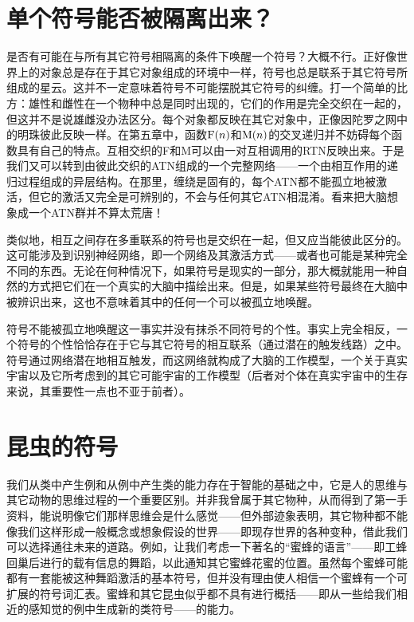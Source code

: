 \section{单个符号能否被隔离出来？}

是否有可能在与所有其它符号相隔离的条件下唤醒一个符号？大概不行。正好像世界上的对象总是存在于其它对象组成的环境中一样，符号也总是联系于其它符号所组成的星云。这并不一定意味着符号不可能摆脱其它符号的纠缠。打一个简单的比方：雄性和雌性在一个物种中总是同时出现的，它们的作用是完全交织在一起的，但这并不是说雄雌没办法区分。每个对象都反映在其它对象中，正像因陀罗之网中的明珠彼此反映一样。在第五章中，函数$\operatorname{F}(n)$和$\operatorname{M}(n)$的交叉递归并不妨碍每个函数具有自己的特点。互相交织的F和M可以由一对互相调用的RTN反映出来。于是我们又可以转到由彼此交织的ATN组成的一个完整网络——一个由相互作用的递归过程组成的异层结构。在那里，缠绕是固有的，每个ATN都不能孤立地被激活，但它的激活又完全是可辨别的，不会与任何其它ATN相混淆。看来把大脑想象成一个ATN群并不算太荒唐！

类似地，相互之间存在多重联系的符号也是交织在一起，但又应当能彼此区分的。这可能涉及到识别神经网络，即一个网络及其激活方式——或者也可能是某种完全不同的东西。无论在何种情况下，如果符号是现实的一部分，那大概就能用一种自然的方式把它们在一个真实的大脑中描绘出来。但是，如果某些符号最终在大脑中被辨识出来，这也不意味着其中的任何一个可以被孤立地唤醒。

符号不能被孤立地唤醒这一事实并没有抹杀不同符号的个性。事实上完全相反，一个符号的个性恰恰存在于它与其它符号的相互联系（通过潜在的触发线路）之中。符号通过网络潜在地相互触发，而这网络就构成了大脑的工作模型，一个关于真实宇宙以及它所考虑到的其它可能宇宙的工作模型（后者对个体在真实宇宙中的生存来说，其重要性一点也不亚于前者）。

\section{昆虫的符号}

我们从类中产生例和从例中产生类的能力存在于智能的基础之中，它是人的思维与其它动物的思维过程的一个重要区别。并非我曾属于其它物种，从而得到了第一手资料，能说明像它们那样思维会是什么感觉——但外部迹象表明，其它物种都不能像我们这样形成一般概念或想象假设的世界——即现存世界的各种变种，借此我们可以选择通往未来的道路。例如，让我们考虑一下著名的“蜜蜂的语言”——即工蜂回巢后进行的载有信息的舞蹈，以此通知其它蜜蜂花蜜的位置。虽然每个蜜蜂可能都有一套能被这种舞蹈激活的基本符号，但并没有理由使人相信一个蜜蜂有一个可扩展的符号词汇表。蜜蜂和其它昆虫似乎都不具有进行概括——即从一些给我们相近的感知觉的例中生成新的类符号——的能力。

